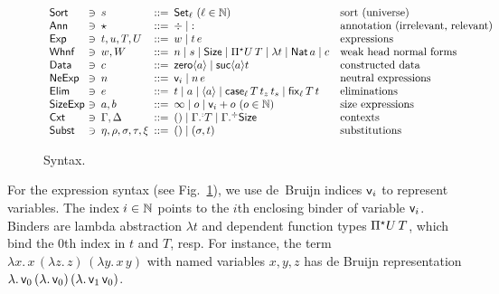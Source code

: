 \documentclass[acmsmall%
]{acmart}\settopmatter{printfolios=true}
\begin{document}
\begin{figure}[htbp]
\centering
\hrulefill
\[
\begin{array}{l@{~}l@{~\,}l@{~\,}r@{~\,}l@{\quad}l}
\Sort & \ni & s
    & ::= & \Set[\ell] ~(\ell \in \NN)& \mbox{sort (universe)} \\
\Ann & \ni & \star & ::= & \erased \mid \noterased & \mbox{annotation (irrelevant, relevant)}\\
\Exp & \ni & t,u,T,U
    & ::= & w \mid t\,e & \mbox{expressions} \\
\Whnf & \ni & w, W
    & ::= & n \mid s \mid \Size \mid \epiT U T %
    \mid \lambda t%
    \mid \Nat a \mid c & \mbox{weak head normal forms} \\ %
\Data & \ni & c
   & ::= & \zero a \mid \suc a t & \mbox{constructed data} \\
\NeExp & \ni & n
    & ::= & \ind i \mid n \, e & \mbox{neutral expressions} \\
\Elim & \ni & e
    & ::= & t \mid a \mid \ann a \mid \case[\ell] T {t_z} {t_s} \mid \fix[\ell] T t & \mbox{eliminations} \\
\SizeExp & \ni & a,b & ::= & \infty \mid o \mid \ind i + o ~(o \in \NN) & \mbox{size expressions} \\
\Cxt & \ni & \Gamma, \Delta & ::= & \cempty \mid \erext[\noterased] \Gamma T \mid \erext \Gamma \Size
   & \mbox{contexts} \\
\Subst & \ni & \eta,\rho,\sigma,\tau,\xi & ::= & \sempty \mid (\sigma,t)
  & \mbox{substitutions} \\
\end{array}
\]
\hrulefill
\vspace{-2ex}
  \caption{Syntax.}
  \label{fig:syntax}
\end{figure}

For the expression syntax (see Fig.~\ref{fig:syntax}), we use
de~Bruijn \citeyearpar{deBruijn:nameless} indices $\mathsf{v}_{i}$ to
represent variables.  The index $i \in \mathbb{N}$ points to the $i$th
enclosing binder of variable $\mathsf{v}_{i}$.  Binders are lambda abstraction
$\lambda t$ and dependent function types $\Pi{}^{\mathord{\star}}U\, T$, which bind the
$0$th index in $t$ and $T$, resp.  For instance, the term
$\lambda x.\,x\,(\lambda z.\,z)\, (\lambda y.\,x\,y)$
with named variables $x,y,z$ has de Bruijn representation
$\lambda.\,\mathsf{v}_{0}\,(\lambda.\, \mathsf{v}_{0})\,(\lambda.\,\mathsf{v}_{1}\,\mathsf{v}_{0})$.
\end{document}
